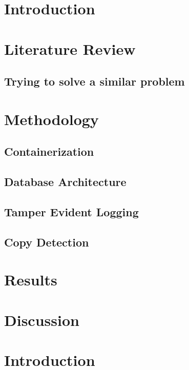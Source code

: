 \documentclass[12pt]{article}
\begin{document}
\section{Introduction}

\section{Literature Review}

\subsection{Trying to solve a similar problem}

\section{Methodology}

\subsection{Containerization}

\subsection{Database Architecture}

\subsection{Tamper Evident Logging}

\subsection{Copy Detection}

\section{Results}

\section{Discussion}

\newpage

\section{Introduction}
\end{document}
